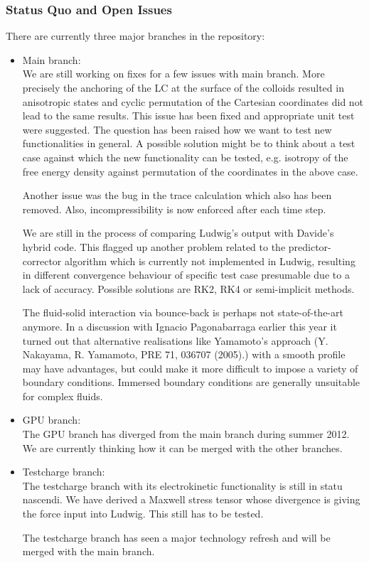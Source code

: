 \documentclass[11pt,twoside]{article}
\begin{document}
\subsubsection{Status Quo and Open Issues}

There are currently three major branches in the repository:

\begin{itemize}
\item Main branch:\\
We are still working on fixes for a few issues with main branch. 
More precisely the anchoring of the LC at the 
surface of the colloids resulted in anisotropic states and cyclic permutation 
of the Cartesian coordinates did not lead to the same results. 
This issue has been fixed and appropriate unit test were suggested.
The question has been raised how we want to test new functionalities in general.
A possible solution might be to think about a test case against which
the new functionality can be tested, e.g. isotropy of the free energy density 
against permutation of the coordinates in the above case.
 
Another issue was the bug in the trace calculation which also has been removed.  
Also, incompressibility is now enforced after each time step.

We are still in the process of comparing Ludwig's output 
with Davide's hybrid code. This flagged 
up another problem related to the predictor-corrector algorithm which is 
currently not implemented in Ludwig, resulting in different convergence 
behaviour of specific test case presumable due to a lack of accuracy.  
Possible solutions are RK2, RK4 or semi-implicit methods.

The fluid-solid interaction via bounce-back is perhaps not state-of-the-art
anymore. In a discussion with Ignacio Pagonabarraga earlier this year
it turned out that alternative realisations like Yamamoto's approach 
(Y. Nakayama, R. Yamamoto, PRE 71, 036707 (2005).) with
a smooth profile may have advantages, but could make it more difficult 
to impose a variety of boundary conditions. Immersed boundary conditions
are generally unsuitable for complex fluids. 

\item GPU branch:\\
The GPU branch has diverged from the main branch during summer 2012.
We are currently thinking how it can be merged with the other branches.

\item Testcharge branch:\\
The testcharge branch with its electrokinetic functionality is still 
in statu nascendi. We have derived a Maxwell stress tensor whose divergence
is giving the force input into Ludwig. This still has to be tested.

The testcharge branch has seen a major technology refresh and will be merged with
the main branch.

\end{itemize}
\end{document}
